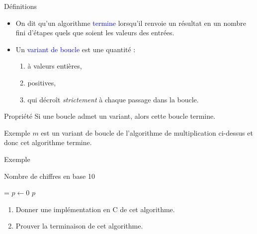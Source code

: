 \documentclass[10pt,french]{beamer}
\begin{document}
\begin{frame}[fragile]{\Ctitle}{\stitle}
	\begin{block}{Définitions}
    \begin{itemize}
        \item<2-> On dit qu'un algorithme \textcolor{blue}{termine} lorsqu'il renvoie un résultat en un nombre fini d'étapes quels que soient les valeurs des entrées.
        \item<3-> Un \textcolor{blue}{variant de boucle} est une quantité :
            \begin{enumerate}
            \item<4-> à valeurs entières,
            \item<5-> positives,
            \item<6-> qui décroît \textit{strictement} à chaque passage dans la boucle.
            \end{enumerate}
		\end{itemize}
	\end{block}
	{\begin{alertblock}{\textcolor{yellow}{\important \;} Propriété}
		Si une boucle admet un variant, alors cette boucle termine.
	\end{alertblock}}
	{
		\begin{exampleblock}{Exemple}
			$m$ est un variant de boucle de l'algorithme de multiplication ci-dessus et donc cet algorithme termine.
		\end{exampleblock}
	}
\end{frame}

\begin{frame}[fragile]{\Ctitle}{\stitle}
	\begin{exampleblock}{Exemple}
	\SetAlFnt{\small}
	\setlength{\algomargin}{8pt}
	\begin{algorithm}[H]
		\DontPrintSemicolon
		\caption{Nombre de chiffres en base 10}
		\everypar={\footnotesize \textcolor{gray}{\nl}}
		$p \leftarrow 0$\;
		\Return $p$
	  \end{algorithm}
	  \begin{enumerate}
	  \item<2-> Donner une implémentation en C de cet algorithme.
	  \item<3-> Prouver la terminaison de cet algorithme.
	  \end{enumerate}
	\end{exampleblock}
\end{frame}
\end{document}
